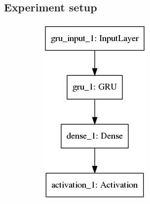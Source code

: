     \subsection{Experiment setup}
    \begin{figure}[H]
        \centering
        \begin{subfigure}{0.4\textwidth}
            \centering
            \includegraphics[width=0.9\linewidth]{../images/model_gru.png}
        \end{subfigure}%
        ~
        \begin{subfigure}{0.4\textwidth}
            \centering

\end{subfigure}
\end{figure}

